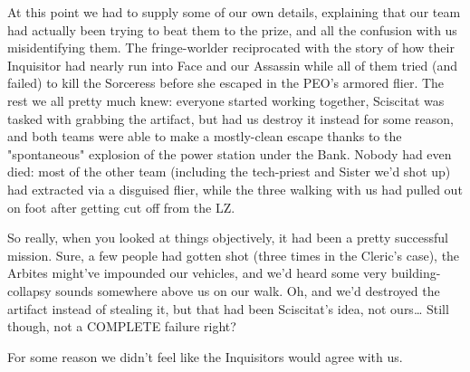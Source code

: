 At this point we had to supply some of our own details, explaining that our team had actually been trying to beat them to the prize, and all the confusion with us misidentifying them. 
The fringe-worlder reciprocated with the story of how their Inquisitor had nearly run into Face and our Assassin while all of them tried (and failed) to kill the Sorceress before she escaped in the PEO's armored flier. 
The rest we all pretty much knew: 
everyone started working together, Sciscitat was tasked with grabbing the artifact, but had us destroy it instead for some reason, and both teams were able to make a mostly-clean escape thanks to the "spontaneous" explosion of the power station under the Bank. 
Nobody had even died: 
most of the other team (including the tech-priest and Sister we'd shot up) had extracted via a disguised flier, while the three walking with us had pulled out on foot after getting cut off from the LZ. 


So really, when you looked at things objectively, it had been a pretty successful mission. 
Sure, a few people had gotten shot (three times in the Cleric's case), the Arbites might've impounded our vehicles, and we'd heard some very building-collapsy sounds somewhere above us on our walk. 
Oh, and we'd destroyed the artifact instead of stealing it, but that had been Sciscitat's idea, not ours… Still though, not a COMPLETE failure right?

For some reason we didn't feel like the Inquisitors would agree with us.

